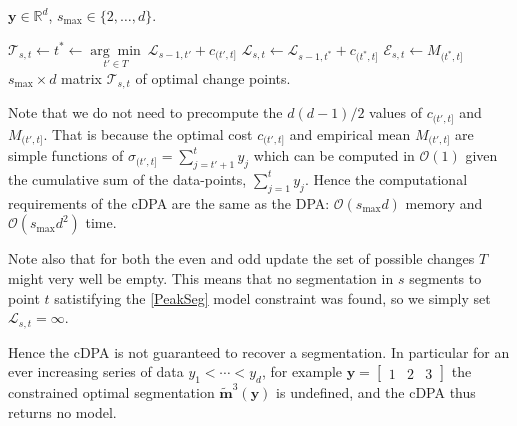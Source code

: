 \documentclass{article}
\newcommand{\RR}{\mathbb R}
\begin{document}
\begin{algorithm}[H]
\begin{algorithmic}[1]
\REQUIRE $\mathbf y\in\RR^d$, $s_{\text{max}}\in\{2, \dots, d\}$.
\CASE{even}{$T \gets \{ t' < t \mid \mathcal{E}_{s-1,t'} < M_{(t', t]} \}$}
\ENDCASE
\CASE{ odd}{$T \gets \{ t' < t \mid \mathcal{E}_{s-1,t'} > M_{(t', t]} \}$}
\ENDCASE
\ENDSWITCH

\ENDCASE
\DEFAULT{}
\STATE $ \mathcal T_{s, t}\gets t^* \gets
\underset{ t'\in T}{\arg \min}\  {\mathcal{L}}_{s-1,t'} + c_{(t',t]}$
\STATE $ {\mathcal{L}}_{s,t} \gets 
{\mathcal{L}}_{s-1,t^*} + c_{(t^*,t]} $
\STATE $\mathcal{E}_{s,t} \gets M_{(t^*, t]}$
\ENDDEFAULT
\ENDSWITCH
\ENDFORFOR
\RETURN $s_{\text{max}}\times d$ matrix $\mathcal T_{s, t}$ of optimal change points.
\caption{Constrained dynamic programming (cDPA) 
}
\end{algorithmic}\label{algo:v2}
\end{algorithm}

Note that we do not need to precompute the $d(d-1)/2$ values of
$c_{(t',t]}$ and $M_{(t', t]}$. That is because the optimal cost
$c_{(t',t]}$ and empirical mean $M_{(t', t]}$ are simple functions of
$\sigma_{(t', t]} =\sum_{j=t'+1}^t y_j$ which can be computed in
$\mathcal{O}(1)$ given the cumulative sum of the data-points,
$\sum_{j=1}^t y_j$. Hence the computational requirements of the cDPA
are the same as the DPA: $\mathcal{O}(s_{\text{max}} d)$ memory and
$\mathcal O(s_{\text{max}} d^2)$ time.

Note also that for both the even and odd update the set of possible
changes $T$ might very well be empty. This means that no segmentation
in $s$ segments to point $t$ satistifying the \ref{PeakSeg} model
constraint was found, so we simply set ${\mathcal L}_{s, t} = \infty$.

Hence the cDPA is not guaranteed to recover a segmentation. In
particular for an ever increasing series of data $y_1 < \cdots < y_d$,
for example $\mathbf y = \left[ \begin{array}{ccc} 1 & 2 &
    3 \end{array}\right]$ the constrained optimal segmentation
$\mathbf{\tilde m}^3(\mathbf y)$ is undefined, and the cDPA thus
returns no model.
\end{document}
